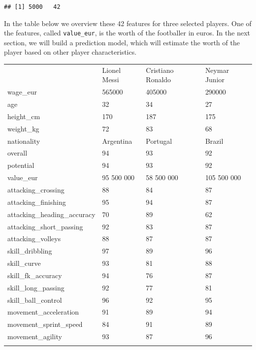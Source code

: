 \documentclass[
]{scrbook}
\begin{document}
\begin{verbatim}
## [1] 5000   42
\end{verbatim}

In the table below we overview these 42 features for three selected players.
One of the features, called \texttt{value\_eur}, is the worth of the footballer in euros. In the next section, we will build a prediction model, which will estimate the worth of the player based on other player characteristics.

\begin{longtable}[]{@{}llll@{}}
\toprule
& Lionel Messi & Cristiano Ronaldo & Neymar Junior \\ \addlinespace
\midrule
\endhead
wage\_eur & 565000 & 405000 & 290000 \\ \addlinespace
age & 32 & 34 & 27 \\ \addlinespace
height\_cm & 170 & 187 & 175 \\ \addlinespace
weight\_kg & 72 & 83 & 68 \\ \addlinespace
nationality & Argentina & Portugal & Brazil \\ \addlinespace
overall & 94 & 93 & 92 \\ \addlinespace
potential & 94 & 93 & 92 \\ \addlinespace
value\_eur & 95 500 000 & 58 500 000 & 105 500 000 \\ \addlinespace
attacking\_crossing & 88 & 84 & 87 \\ \addlinespace
attacking\_finishing & 95 & 94 & 87 \\ \addlinespace
attacking\_heading\_accuracy & 70 & 89 & 62 \\ \addlinespace
attacking\_short\_passing & 92 & 83 & 87 \\ \addlinespace
attacking\_volleys & 88 & 87 & 87 \\ \addlinespace
skill\_dribbling & 97 & 89 & 96 \\ \addlinespace
skill\_curve & 93 & 81 & 88 \\ \addlinespace
skill\_fk\_accuracy & 94 & 76 & 87 \\ \addlinespace
skill\_long\_passing & 92 & 77 & 81 \\ \addlinespace
skill\_ball\_control & 96 & 92 & 95 \\ \addlinespace
movement\_acceleration & 91 & 89 & 94 \\ \addlinespace
movement\_sprint\_speed & 84 & 91 & 89 \\ \addlinespace
movement\_agility & 93 & 87 & 96 \\ \addlinespace

\end{longtable}
\end{document}
